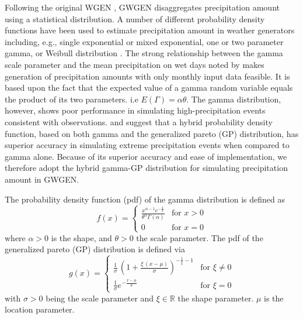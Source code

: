 \begin{refsection}
Following the original WGEN \citep{Richardson1981}, GWGEN disaggregates precipitation amount using a statistical distribution. A number of different probability density functions have been used to estimate precipitation amount in weather generators including, e.g., single exponential or mixed exponential, one or two parameter gamma, or Weibull distribution \citep{WilksWilby1999}. The strong relationship between the gamma scale parameter and the mean precipitation on wet days noted by \cite{GengDevriesSupit1986} makes generation of precipitation amounts with only monthly input data feasible. It is based upon the fact that the expected value of a gamma random variable equals the product of its two parameters. i.e $E(\Gamma) = \alpha\theta$. The gamma distribution, however, shows poor performance in simulating high-precipitation events consistent with observations. \cite{FurrerKatz2008} and \cite{NeykovNeytchevZucchini2014} suggest that a hybrid probability density function, based on both gamma and the generalized pareto (GP) distribution, has superior accuracy in simulating extreme precipitation events when compared to gamma alone. Because of its superior accuracy and ease of implementation, we therefore adopt the hybrid gamma-GP distribution for simulating precipitation amount in GWGEN.

The probability density function (pdf) of the gamma distribution is defined as
\begin{equation}
f(x) = \begin{cases}
\frac{x^{\alpha - 1}e^{-\frac{x}{\theta}}}{\theta^{\alpha} \Gamma(\alpha)} & \text{for } x > 0 \\
0 & \text{for } x = 0
\end{cases} \label{eq:gamma}
\end{equation}
where $\alpha > 0$ is the shape, and $\theta > 0$ the scale parameter.
The pdf of the generalized pareto (GP) distribution is defined via
\begin{equation}
g(x) = \begin{cases}
\frac{1}{\sigma}\, \left( 1 + \frac{\xi\,\left(x - \mu\right)}{\sigma}\right)^{-\frac{1}{\xi} - 1} \label{eq:GP} & \text{for } \xi \neq 0 \\
\frac{1}{\sigma}e^{-\frac{x-\mu}{\sigma}} & \text{for } \xi = 0
\end{cases}
\end{equation}
with $\sigma > 0$ being the scale parameter and $\xi \in \mathbb{R}$ the shape parameter. $\mu$ is the location parameter.


\end{refsection}
